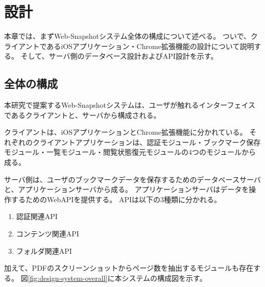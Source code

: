 \chapter{設計}
\label{chap:design}
本章では、まずWeb-Snapshotシステム全体の構成について述べる。
ついで、クライアントであるiOSアプリケーション・Chrome拡張機能の設計について説明する。
そして、サーバ側のデータベース設計およびAPI設計を示す。

\section{全体の構成}
本研究で提案するWeb-Snapshotシステムは、ユーザが触れるインターフェイスであるクライアントと、サーバから構成される。

クライアントは、iOSアプリケーションとChrome拡張機能に分かれている。
それぞれのクライアントアプリケーションは、認証モジュール・ブックマーク保存モジュール・一覧モジュール・閲覧状態復元モジュールの4つのモジュールから成る。

サーバ側は、ユーザのブックマークデータを保存するためのデータベースサーバと、アプリケーションサーバから成る。
アプリケーションサーバはデータを操作するためのWebAPIを提供する。
APIは以下の3種類に分かれる。

\begin{enumerate}
   \item 認証関連API
   \item コンテンツ関連API
   \item フォルダ関連API
\end{enumerate}

加えて、PDFのスクリーンショットからページ数を抽出するモジュールも存在する。
図\ref{fig:design-system-overall}に本システムの構成図を示す。

